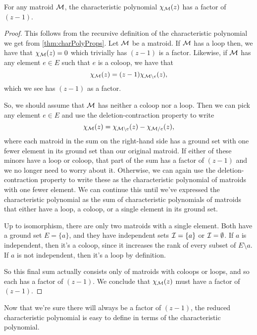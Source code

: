 \documentclass[12pt,oneside]{../../sfsuthesis}
\begin{document}
\begin{proposition}\th\label{thm:charPolyFactor}
    For any matroid \( \mathcal{M} \), the characteristic polynomial \( \chi_{\mathcal{M}}(z) \) has a factor of \( (z - 1) \).
\end{proposition}
\begin{proof}
    This follows from the recursive definition of the characteristic polynomial we get from \th\ref{thm:charPolyProps}.
    Let \( \mathcal{M} \) be a matroid.
    If \( \mathcal{M} \) has a loop then, we have that \( \chi_{\mathcal{M}}(z) = 0 \) which trivially has \( (z - 1) \) is a factor.
    Likewise, if \( \mathcal{M} \) has any element \( e \in E \) such that \( e \) is a coloop, we have that
    \[
        \chi_{\mathcal{M}}(z) = (z - 1)\chi_{\mathcal{M} \setminus e}(z),
    \]
    which we see has \( (z - 1) \) as a factor.

    So, we should assume that \( \mathcal{M} \) has neither a coloop nor a loop.
    Then we can pick any element \( e \in E \) and use the deletion-contraction property to write
    \[
        \chi_{\mathcal{M}}(z) = \chi_{\mathcal{M} \setminus e}(z) - \chi_{\mathcal{M} / e}(z),
    \]
    where each matroid in the sum on the right-hand side has a ground set with one fewer element in its ground set than our original matroid.
    If either of these minors have a loop or coloop, that part of the sum has a factor of \( (z - 1) \) and we no longer need to worry about it.
    Otherwise, we can again use the deletion-contraction property to write these as the characteristic polynomial of matroids with one fewer element.
    We can continue this until we've expressed the characteristic polynomial as the sum of characteristic polynomials of matroids that either have a loop, a coloop, or a single element in its ground set.

    Up to isomorphism, there are only two matroids with a single element.
    Both have a ground set \( E = \{a\} \), and they have independent sets \( \mathcal{I} = \{a\} \) or \( \mathcal{I} = \emptyset \).
    If \( a \) is independent, then it's a coloop, since it increases the rank of every subset of \( E \setminus a \).
    If \( a \) is not independent, then it's a loop by definition.

    So this final sum actually consists only of matroids with coloops or loops, and so each has a factor of \( (z - 1) \).
    We conclude that \( \chi_{\mathcal{M}}(z) \) must have a factor of \( (z - 1) \).
\end{proof}
Now that we're sure there will always be a factor of \( (z - 1) \), the reduced characteristic polynomial is easy to define in terms of the characteristic polynomial.
\end{document}
